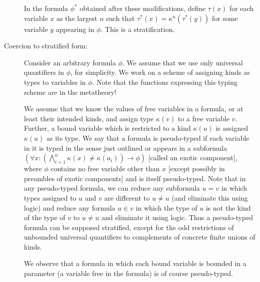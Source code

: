 \documentclass[12pt]{article}
\begin{document}
\begin{description}
 In the formula
$\phi^*$ obtained after these modifications, define $\tau(x)$ for each variable $x$ as the largest $n$ such that $\tau^*(x) = \kappa^n(\tau^*(y))$ for some variable $y$ appearing in $\phi$.  This is a stratification.



\item[Coercion to stratified form:]

Consider an arbitrary formula $\phi$.   We assume that we use only universal quantifiers in $\phi$, for simplicity.  We work on a scheme of assigning kinds as types to variables in $\phi$.  Note that the functions expressing this typing scheme are in the metatheory!

We assume that we know the values of free variables in a formula, or at least their intended kinds, and assign type $\kappa(v)$ to a free variable $v$.  Further, a bound variable which is restricted to a kind $\kappa(u)$ is assigned $\kappa(u)$ as its type.   We say that a formula is pseudo-typed if each variable in it is typed in the sense just outlined
or appears in a subformula $(\forall x:(\bigwedge_{i=1}^n \kappa(x) \neq \kappa(a_i )) \rightarrow \phi)$ [called an exotic component], where $\phi$ contains no free variable other than $x$ [except possibly in preambles of exotic components] and is itself pseudo-typed.  Note that in any pseudo-typed formula, we can reduce any subformula $u=v$ in which types assigned to $u$ and $v$ are different to $u \neq u$ (and eliminate this using logic) and reduce any formula $u \in v$ in which the type of $u$ is not the kind of the type of $v$ to $u\neq u$ and eliminate it using logic.  Thus a pseudo-typed formula can be supposed stratified, except for the odd restrictions of unbounded universal quantifiers to complements of concrete finite unions of kinds.

We observe that a formula in which each bound variable is bounded in a parameter (a variable free in the formula) is of course pseudo-typed.


\end{description}
\end{document}
